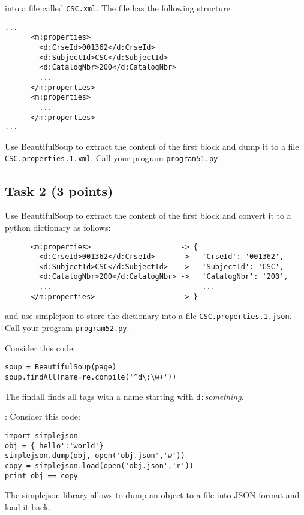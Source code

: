 \documentclass[12pt]{article}
\begin{document}
\noindent into a file called {\tt CSC.xml}. The file has the following structure

\begin{verbatim}
...
      <m:properties>
        <d:CrseId>001362</d:CrseId>
        <d:SubjectId>CSC</d:SubjectId>
        <d:CatalogNbr>200</d:CatalogNbr>
        ...
      </m:properties>
      <m:properties>
        ...
      </m:properties>
...
\end{verbatim}

\noindent Use BeautifulSoup to extract the content of the first {\tt <m:properties>} block and dump it to a file {\tt CSC.properties.1.xml}. Call your program {\tt program51.py}.

\subsection{Task 2 (3 points)}

\noindent Use BeautifulSoup to extract the content of the first {\tt <m:properties>} block and convert it to a python dictionary as follows:

\begin{verbatim}
      <m:properties>                     -> {
        <d:CrseId>001362</d:CrseId>      ->   'CrseId': '001362',
        <d:SubjectId>CSC</d:SubjectId>   ->   'SubjectId': 'CSC',
        <d:CatalogNbr>200</d:CatalogNbr> ->   'CatalogNbr': '200',
        ...                                   ...
      </m:properties>                    -> }
\end{verbatim}

\noindent and use simplejson to store the dictionary into a file {\tt CSC.properties.1.json}. Call your program {\tt program52.py}.

 Consider this code:
\begin{verbatim}
soup = BeautifulSoup(page)
soup.findAll(name=re.compile('^d\:\w+'))
\end{verbatim}

\noindent The findall finds all tags with a name starting with {\tt d:}{\it something}.

: Consider this code:

\begin{verbatim}
import simplejson
obj = {'hello':'world'}
simplejson.dump(obj, open('obj.json','w'))
copy = simplejson.load(open('obj.json','r'))
print obj == copy
\end{verbatim}

\noindent The simplejson library allows to dump an object to a file into JSON format and load it back.
\end{document}
